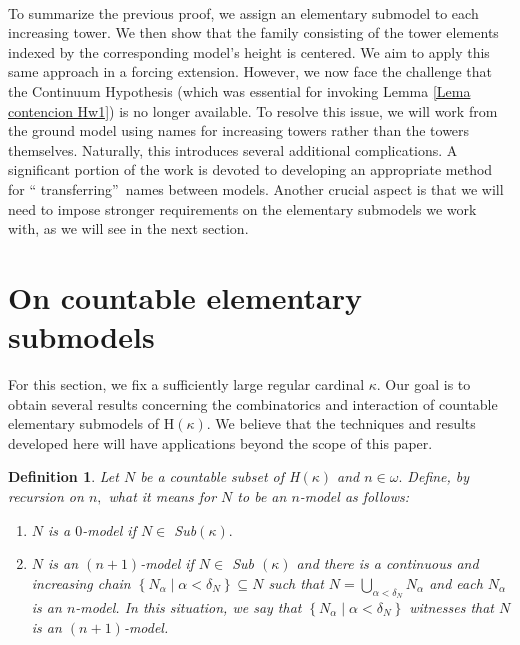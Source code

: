 \documentclass{article}%
\newtheorem{definition}[theorem]{Definition}
\begin{document}
\qquad\qquad\ \ \qquad\ \ \ \ 

To summarize the previous proof, we assign an elementary submodel to each
increasing tower. We then show that the family consisting of the tower
elements indexed by the corresponding model's height is centered. We aim to
apply this same approach in a forcing extension. However, we now face the
challenge that the Continuum Hypothesis (which was essential for invoking
Lemma \ref{Lema contencion Hw1}) is no longer available. To resolve this
issue, we will work from the ground model using names for increasing towers
rather than the towers themselves. Naturally, this introduces several
additional complications. A significant portion of the work is devoted to
developing an appropriate method for \textquotedblleft
transferring\textquotedblright\ names between models. Another crucial aspect
is that we will need to impose stronger requirements on the elementary
submodels we work with, as we will see in the next section.

\section{On countable elementary submodels \label{Seccion submodelos}}

For this section, we fix a sufficiently large regular cardinal $\kappa$. Our
goal is to obtain several results concerning the combinatorics and interaction
of countable elementary submodels of \textsf{H}$\left(  \kappa\right)  .$ We
believe that the techniques and results developed here will have applications
beyond the scope of this paper.

\begin{definition}
Let $N$ be a countable subset of \textsf{H}$\left(  \kappa\right)  $ and
$n\in\omega.$ Define, by recursion on $n,$ what it means for $N$ \emph{to be
an }$n$\emph{-model} as follows:

\begin{enumerate}
\item $N$ is a $0$\emph{-model} if $N\in$ \textsf{Sub}$\left(  \kappa\right)
.$

\item $N$ is an $\left(  n+1\right)  $\emph{-model} if $N\in$ \textsf{Sub}%
$\left(  \kappa\right)  $ and there is a continuous and increasing chain
$\left\{  N_{\alpha}\mid\alpha<\delta_{N}\right\}  \subseteq N$ such that $N=%
{\textstyle\bigcup\limits_{\alpha<\delta_{N}}}
N_{\alpha}$ and each $N_{\alpha}$ is an $n$-model. In this situation, we say
that $\left\{  N_{\alpha}\mid\alpha<\delta_{N}\right\}  $ witnesses that $N$
\emph{is an} $\left(  n+1\right)  $\emph{-model.}
\end{enumerate}
\end{definition}
\end{document}
